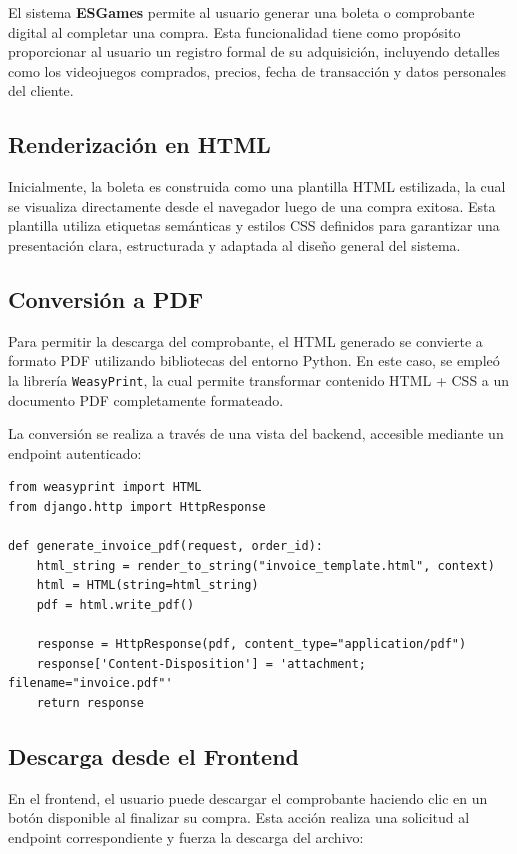 \documentclass{article}
\begin{document}
El sistema \textbf{ESGames} permite al usuario generar una boleta o comprobante digital al completar una compra. Esta funcionalidad tiene como propósito proporcionar al usuario un registro formal de su adquisición, incluyendo detalles como los videojuegos comprados, precios, fecha de transacción y datos personales del cliente.

\subsection{Renderización en HTML}

Inicialmente, la boleta es construida como una plantilla HTML estilizada, la cual se visualiza directamente desde el navegador luego de una compra exitosa. Esta plantilla utiliza etiquetas semánticas y estilos CSS definidos para garantizar una presentación clara, estructurada y adaptada al diseño general del sistema.

\subsection{Conversión a PDF}

Para permitir la descarga del comprobante, el HTML generado se convierte a formato PDF utilizando bibliotecas del entorno Python. En este caso, se empleó la librería \texttt{WeasyPrint}, la cual permite transformar contenido HTML + CSS a un documento PDF completamente formateado.

La conversión se realiza a través de una vista del backend, accesible mediante un endpoint autenticado:

\begin{verbatim}
from weasyprint import HTML
from django.http import HttpResponse

def generate_invoice_pdf(request, order_id):
    html_string = render_to_string("invoice_template.html", context)
    html = HTML(string=html_string)
    pdf = html.write_pdf()

    response = HttpResponse(pdf, content_type="application/pdf")
    response['Content-Disposition'] = 'attachment; filename="invoice.pdf"'
    return response
\end{verbatim}

\subsection{Descarga desde el Frontend}

En el frontend, el usuario puede descargar el comprobante haciendo clic en un botón disponible al finalizar su compra. Esta acción realiza una solicitud al endpoint correspondiente y fuerza la descarga del archivo:
\end{document}

